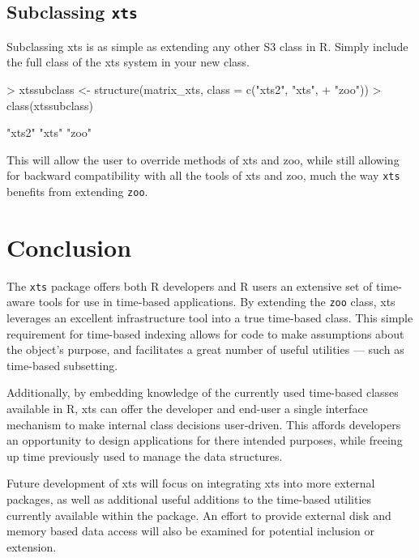 \documentclass{article}
\begin{document}
\subsection{Subclassing {\tt xts}}
Subclassing xts is as simple as extending any other
S3 class in R.  Simply include the full class of
the xts system in your new class.

\begin{Schunk}
\begin{Sinput}
> xtssubclass <- structure(matrix_xts, class = c("xts2", "xts", 
+     "zoo"))
> class(xtssubclass)
\end{Sinput}
\begin{Soutput}
[1] "xts2" "xts"  "zoo" 
\end{Soutput}
\end{Schunk}

This will allow the user to override methods of xts and zoo,
while still allowing for backward compatibility with
all the tools of xts and zoo, much the way {\tt xts} benefits from
extending {\tt zoo}.

\section{Conclusion}
The {\tt xts} package offers both R developers and R users
an extensive set of time-aware tools for use in
time-based applications.  By extending the {\tt zoo} class,
xts leverages an excellent infrastructure tool into
a true time-based class.  This simple requirement for
time-based indexing allows for code to
make assumptions about the object's purpose, and facilitates
a great number of useful utilities --- such as time-based
subsetting.

Additionally, by embedding knowledge of the currently
used time-based classes available in R, xts can offer
the developer and end-user a single interface mechanism
to make internal class decisions user-driven.  This
affords developers an opportunity to design applications
for there intended purposes, while freeing up time
previously used to manage the data structures.

Future development of xts will focus on integrating
xts into more external packages, as well as additional useful
additions to the time-based utilities currently available
within the package.  An effort to provide external disk and
memory based data access will also be examined for potential
inclusion or extension.
\end{document}
